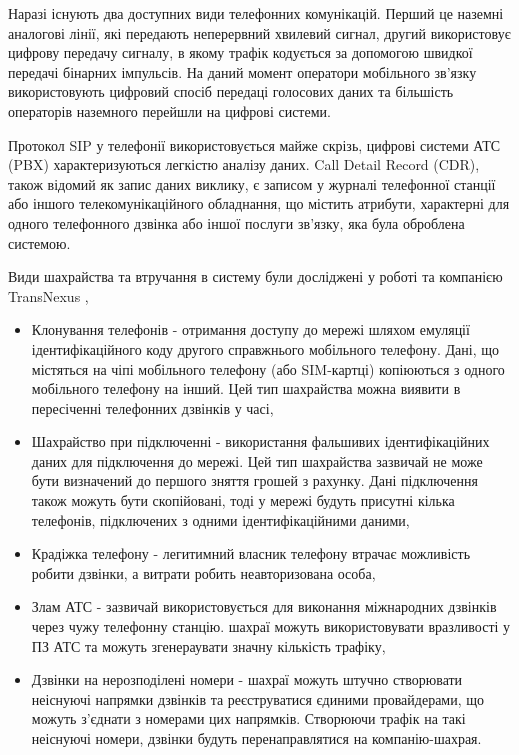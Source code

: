   Наразі існують два доступних види телефонних комунікацій. Перший це наземні аналогові лінії, які передають неперервний хвилевий сигнал, другий використовує цифрову передачу сигналу, в якому трафік кодується за допомогою швидкої передачі бінарних імпульсів. На даний момент оператори мобільного зв'язку використовують цифровий спосіб передаці голосових даних та більшість операторів наземного перейшли на цифрові системи.

  Протокол SIP у телефонії використовується майже скрізь, цифрові системи АТС (PBX) характеризуються легкістю аналізу даних. Call Detail Record (CDR), також відомий як запис даних виклику, є записом у журналі телефонної станції або іншого телекомунікаційного обладнання, що містить атрибути, характерні для одного телефонного дзвінка або іншої послуги зв'язку, яка була оброблена системою.

  Види шахрайства та втручання в систему були досліджені у роботі \cite{barson1996detection} та компанією TransNexus \cite{transnexus2012voipfraud},

\begin{itemize}
  \item Клонування телефонів - отримання доступу до мережі шляхом емуляції ідентифікаційного коду
другого справжнього мобільного телефону. Дані, що містяться на чіпі мобільного телефону (або SIM-картці) копіюються з одного мобільного телефону на інший. Цей тип шахрайства можна виявити в пересіченні телефонних дзвінків у часі,
  \item Шахрайство при підключенні - використання фальшивих ідентифікаційних даних для підключення до мережі. Цей тип шахрайства зазвичай не може бути визначений до першого зняття грошей з рахунку. Дані підключення також можуть бути скопійовані, тоді у мережі будуть присутні кілька телефонів, підключених з одними ідентифікаційними даними,
  \item Крадіжка телефону - легитимний власник телефону втрачає можливість робити дзвінки, а витрати робить неавторизована особа,
  \item Злам АТС - зазвичай використовується для виконання міжнародних дзвінків через чужу телефонну станцію. шахраї можуть використовувати вразливості у ПЗ АТС та можуть згенераувати значну кількість трафіку,
  \item Дзвінки на нерозподілені номери - шахраї можуть штучно створювати неіснуючі напрямки дзвінків та реєструватися єдиними провайдерами, що можуть з'єднати з номерами цих напрямків. Створюючи трафік на такі неіснуючі номери, дзвінки будуть перенаправлятися на компанію-шахрая.
\end{itemize}

